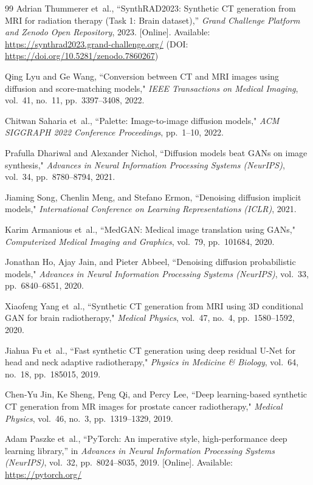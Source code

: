 \begin{thebibliography}{99}
Adrian Thummerer et~al., ``SynthRAD2023: Synthetic CT generation from MRI for radiation therapy (Task 1: Brain dataset),'' \emph{Grand Challenge Platform and Zenodo Open Repository}, 2023. [Online]. Available: \url{https://synthrad2023.grand-challenge.org/} (DOI: \url{https://doi.org/10.5281/zenodo.7860267})

Qing Lyu and Ge Wang, ``Conversion between CT and MRI images using diffusion and score-matching models," \emph{IEEE Transactions on Medical Imaging}, vol.~41, no.~11, pp.~3397--3408, 2022.

Chitwan Saharia et~al., ``Palette: Image-to-image diffusion models," \emph{ACM SIGGRAPH 2022 Conference Proceedings}, pp.~1--10, 2022.

Prafulla Dhariwal and Alexander Nichol, ``Diffusion models beat GANs on image synthesis," \emph{Advances in Neural Information Processing Systems (NeurIPS)}, vol.~34, pp.~8780--8794, 2021.

Jiaming Song, Chenlin Meng, and Stefano Ermon, ``Denoising diffusion implicit models," \emph{International Conference on Learning Representations (ICLR)}, 2021.

Karim Armanious et~al., ``MedGAN: Medical image translation using GANs," \emph{Computerized Medical Imaging and Graphics}, vol.~79, pp.~101684, 2020.

Jonathan Ho, Ajay Jain, and Pieter Abbeel, ``Denoising diffusion probabilistic models," \emph{Advances in Neural Information Processing Systems (NeurIPS)}, vol.~33, pp.~6840--6851, 2020.

Xiaofeng Yang et~al., ``Synthetic CT generation from MRI using 3D conditional GAN for brain radiotherapy," \emph{Medical Physics}, vol.~47, no.~4, pp.~1580--1592, 2020.

Jiahua Fu et~al., ``Fast synthetic CT generation using deep residual U-Net for head and neck adaptive radiotherapy," \emph{Physics in Medicine \& Biology}, vol.~64, no.~18, pp.~185015, 2019.

Chen-Yu Jin, Ke Sheng, Peng Qi, and Percy Lee, ``Deep learning-based synthetic CT generation from MR images for prostate cancer radiotherapy," \emph{Medical Physics}, vol.~46, no.~3, pp.~1319--1329, 2019.

Adam Paszke et~al., ``PyTorch: An imperative style, high-performance deep learning library,'' in \emph{Advances in Neural Information Processing Systems (NeurIPS)}, vol.~32, pp.~8024--8035, 2019. [Online]. Available: \url{https://pytorch.org/}


\end{thebibliography}
